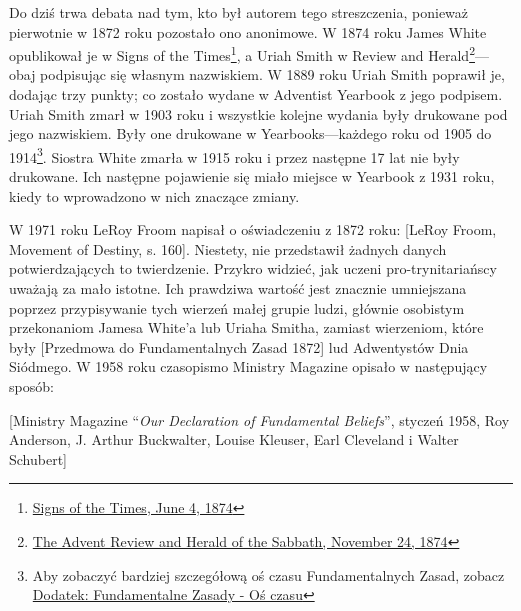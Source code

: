 Do dziś trwa debata nad tym, kto był autorem tego streszczenia, ponieważ pierwotnie w 1872 roku pozostało ono anonimowe. W 1874 roku James White opublikował je w Signs of the Times\footnote{\href{https://adventistdigitallibrary.org/adl-364148/signs-times-june-4-1874}{Signs of the Times, June 4, 1874}}, a Uriah Smith w Review and Herald\footnote{\href{http://documents.adventistarchives.org/Periodicals/RH/RH18741124-V44-22.pdf}{The Advent Review and Herald of the Sabbath, November 24, 1874}}—obaj podpisując się własnym nazwiskiem. W 1889 roku Uriah Smith poprawił je, dodając trzy punkty; co zostało wydane w Adventist Yearbook  z jego podpisem. Uriah Smith zmarł w 1903 roku i wszystkie kolejne wydania  były drukowane pod jego nazwiskiem. Były one drukowane w Yearbooks—każdego roku od 1905 do 1914\footnote{Aby zobaczyć bardziej szczegółową oś czasu Fundamentalnych Zasad, zobacz \hyperref[appendix:timeline]{Dodatek: Fundamentalne Zasady - Oś czasu}}. Siostra White zmarła w 1915 roku i przez następne 17 lat  nie były drukowane. Ich następne pojawienie się miało miejsce w Yearbook z 1931 roku, kiedy to wprowadzono w nich znaczące zmiany.

W 1971 roku LeRoy Froom napisał o oświadczeniu z 1872 roku: [LeRoy Froom, Movement of Destiny, s. 160]. Niestety, nie przedstawił żadnych danych potwierdzających to twierdzenie. Przykro widzieć, jak uczeni pro-trynitariańscy uważają  za mało istotne. Ich prawdziwa wartość jest znacznie umniejszana poprzez przypisywanie tych wierzeń małej grupie ludzi, głównie osobistym przekonaniom Jamesa White'a lub Uriaha Smitha, zamiast wierzeniom, które były [Przedmowa do Fundamentalnych Zasad 1872] lud Adwentystów Dnia Siódmego. W 1958 roku czasopismo Ministry Magazine opisało  w następujący sposób:

[Ministry Magazine “\textit{Our Declaration of Fundamental Beliefs}”, styczeń 1958, Roy Anderson, J. Arthur Buckwalter, Louise Kleuser, Earl Cleveland i Walter Schubert]

